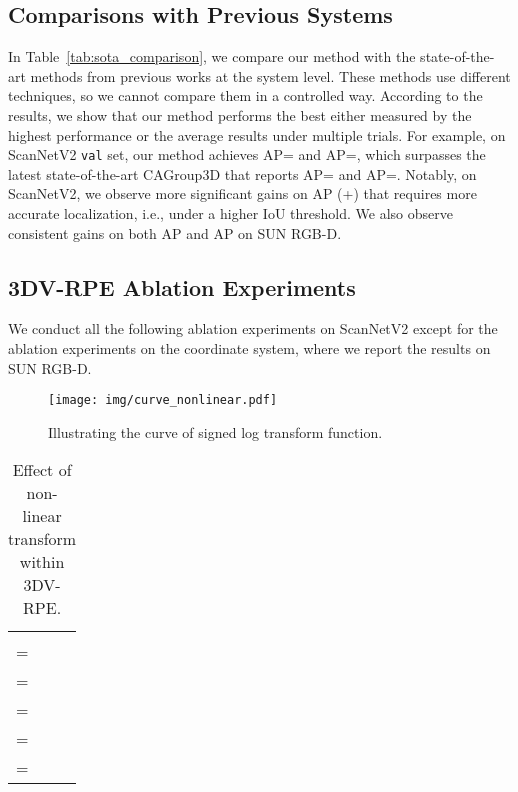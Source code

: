 \documentclass[10pt,twocolumn,letterpaper]{article}
\begin{document}
\subsection{Comparisons with Previous Systems}
In Table~\ref{tab:sota_comparison}, we compare our method with the state-of-the-art methods from previous works at the system level.
These methods use different techniques, so we cannot compare them in a controlled way. According to the results, we show that our method performs the best either measured by the highest performance or the average results under multiple trials. For example, on ScanNetV2 \texttt{val} set, our method achieves AP= and AP=, which surpasses the latest state-of-the-art CAGroup3D that reports AP= and AP=.
Notably, on ScanNetV2, we observe more significant gains on AP (+) that requires more accurate localization, i.e., under a higher IoU threshold.
We also observe consistent gains on both AP and AP on SUN RGB-D.

\subsection{3DV-RPE Ablation Experiments}
We conduct all the following ablation experiments on ScanNetV2 except for the ablation experiments on the coordinate system, where we report the results on SUN RGB-D.
\vspace{1mm}

\begin{figure}[t]
\centering
\texttt{[image: img/curve\_nonlinear.pdf]}
\caption{\small{{Illustrating the curve of signed log transform function.}}}
\label{fig:curve_nonlinear}
\end{figure}

\begin{table}[t]
\footnotesize
\renewcommand{\arraystretch}{1.2}
\centering
\begin{minipage}{1\linewidth}
{\begin{center}
\resizebox{1.0\linewidth}{!}
{
\begin{tabular}{l|cc}
   &  &  \\
    \shline
     =  & & \\
     =  & & \\
     =  & & \\
     =  & & \\
    \rowcolor{gray!10} =  &  &  \\  
\end{tabular}
}
\end{center}}
\end{minipage}
\caption{\small{Effect of non-linear transform within 3DV-RPE}.}
\label{tab:3dv_rpe_nonlinear}
\end{table}
\end{document}
